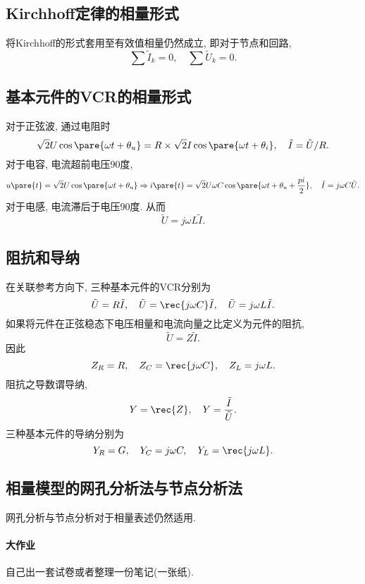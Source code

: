 \documentclass{ctexart}
\begin{document}

\subsection{Kirchhoff定律的相量形式} %
\label{sub:kirchhoff定律的相量形式}

将Kirchhoff的形式套用至有效值相量仍然成立, 即对于节点和回路,
\[ \sum \tilde{I}_k = 0,\quad \sum \tilde{U}_k = 0. \]


\subsection{基本元件的VCR的相量形式} %
\label{sub:基本元件的vcr的相量形式}

对于正弦波, 通过电阻时
\[ \sqrt{2}U\cos\pare{\omega t + \theta_u} = R\times\sqrt{2}I\cos\pare{\omega t + \theta_i},\quad \tilde I = \tilde U / R. \]
对于电容, 电流超前电压$90$度,
\[ u\pare{t} = \sqrt{2}U\cos\pare{\omega t + \theta_u} \Rightarrow i\pare{t} = \sqrt{2}U\omega C\cos\pare{\omega t + \theta_u + \frac{pi}{2}}, \quad \tilde{I} = j\omega C \tilde U. \]
对于电感, 电流滞后于电压$90$度. 从而
\[ \tilde{U} = j\omega L\tilde I. \]


\subsection{阻抗和导纳} %
\label{sub:阻抗和导纳}

在关联参考方向下, 三种基本元件的VCR分别为
\[ \tilde{U} = R\tilde{I},\quad \tilde{U} = \rec{j\omega C}\tilde{I},\quad \tilde{U} = j\omega L\tilde{I}. \]
如果将元件在正弦稳态下电压相量和电流向量之比定义为元件的阻抗,
\[ \tilde{U} = Z\tilde{I}. \]
因此
\[ Z_R = R,\quad Z_C = \rec{j\omega C},\quad Z_L = j\omega L. \]
阻抗之导数谓导纳,
\[ Y = \rec{Z},\quad Y = \frac{\tilde{I}}{\tilde{U}}. \]
三种基本元件的导纳分别为
\[ Y_R = G,\quad Y_C = j\omega C,\quad Y_L = \rec{j\omega L}. \]


\subsection{相量模型的网孔分析法与节点分析法} %
\label{sub:相量模型的网孔分析法与节点分析法}

网孔分析与节点分析对于相量表述仍然适用.



\paragraph{大作业} %
\label{par:大作业}
自己出一套试卷或者整理一份笔记(一张纸).

\end{document}
